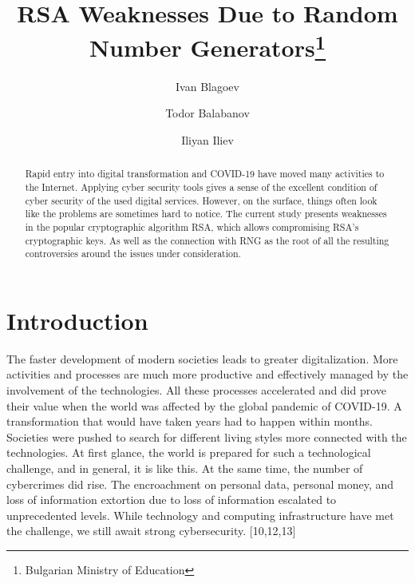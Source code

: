 \documentclass[runningheads]{llncs}
\begin{document}
\title{RSA Weaknesses Due to Random Number Generators\thanks{Bulgarian Ministry of Education}}


\author{Ivan Blagoev \and
Todor Balabanov \and
Iliyan Iliev}



\maketitle

\begin{abstract}
Rapid entry into digital transformation and COVID-19 have moved many activities to the Internet. Applying cyber security tools gives a sense of the excellent condition of cyber security of the used digital services. However, on the surface, things often look like the problems are sometimes hard to notice. The current study presents weaknesses in the popular cryptographic algorithm RSA, which allows compromising RSA's cryptographic keys. As well as the connection with RNG as the root of all the resulting controversies around the issues under consideration.

\end{abstract}

\section{Introduction}
\label{sec:1}

The faster development of modern societies leads to greater digitalization. More activities and processes are much more productive and effectively managed by the involvement of the technologies. All these processes accelerated and did prove their value when the world was affected by the global pandemic of COVID-19. A transformation that would have taken years had to happen within months. Societies were pushed to search for different living styles more connected with the technologies. At first glance, the world is prepared for such a technological challenge, and in general, it is like this. At the same time, the number of cybercrimes did rise. The encroachment on personal data, personal money, and loss of information extortion due to loss of information escalated to unprecedented levels. While technology and computing infrastructure have met the challenge, we still await strong cybersecurity. [10,12,13]
\end{document}
